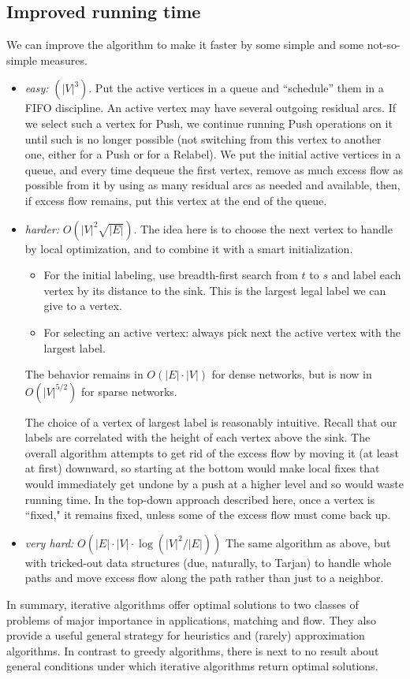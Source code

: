 \documentclass{article}
\begin{document}
\subsection*{Improved running time}
We can improve the algorithm to make it faster by some simple and some
not-so-simple measures.
\begin{itemize}
  \itemsep 0pt
  \item
    \textit{easy:} $(|V|^3)$.  Put the active vertices in a queue and
    ``schedule'' them in a FIFO discipline. An active vertex may have 
    several outgoing residual arcs. If we select such a vertex
    for Push, we continue running Push operations on it until such is no
    longer possible (not switching from this vertex to another one, either for a Push or for a Relabel). We put the initial active vertices in a queue, 
and every time dequeue the first vertex, remove as much excess flow as possible from it by using as
many residual arcs as needed and available, then, if excess flow remains,
put this vertex at the end of the queue.
  \item
    \textit{harder:} $O(|V|^2\sqrt{|E|})$.  The idea here is to choose
    the next vertex to handle by local optimization, and to combine it with
    a smart initialization.
    \begin{itemize}
     \itemsep 0pt
     \item
       For the initial labeling, use breadth-first search from $t$ to $s$
       and label each vertex by its distance to the sink.
       This is the largest legal label we can give to a vertex.
     \item
       For selecting an active vertex: always pick next the active vertex
       with the largest label.
    \end{itemize}
    The behavior remains in $O(|E|\cdot |V|)$ for dense networks, but is
    now in $O(|V|^{5/2})$ for sparse networks.

    The choice of a vertex of largest label is reasonably intuitive.
    Recall that our labels are correlated with the height of each vertex
    above the sink. The overall algorithm attempts to get rid of the excess
    flow by moving it (at least at first) downward, so starting at the
    bottom would make local fixes that would immediately get undone
    by a push at a higher level and so would waste running time.
    In the top-down approach described here, once a vertex is ``fixed,"
    it remains fixed, unless some of the excess flow must come back up.
  \item \textit{very hard:} $O(|E|\cdot |V|\cdot\log(|V|^2/|E|))$
    The same algorithm as above, but with tricked-out data structures
    (due, naturally, to Tarjan) to handle whole paths and move excess
    flow along the path rather than just to a neighbor.
\end{itemize}

In summary, iterative algorithms offer optimal solutions to two classes
of problems of major importance in applications, matching and flow.  They
also provide a useful general strategy for heuristics and (rarely)
approximation algorithms.  In contrast to greedy algorithms, there is
next to no result about general conditions under which iterative algorithms
return optimal solutions.
\end{document}
